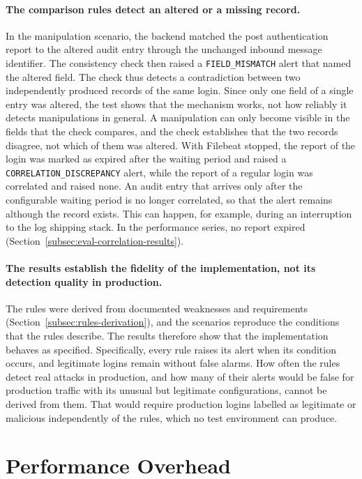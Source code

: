 \documentclass[../main.tex]{subfiles}
\begin{document}
\paragraph{The comparison rules detect an altered or a missing record.} 
In the manipulation scenario, the backend matched the post authentication report to the altered 
audit entry through the unchanged inbound message identifier. 
The consistency check then raised a \texttt{FIELD\_\allowbreak{}MISMATCH} alert that named the altered field. 
The check thus detects a contradiction between two independently produced records of the same login. 
Since only one field of a single entry was altered, the test shows that the mechanism works, not how 
reliably it detects manipulations in general. 
A manipulation can only become visible in the fields that the check compares, and the check 
establishes that the two records disagree, not which of them was altered. 
With Filebeat stopped, the report of the login was marked as expired after the waiting period and 
raised a \texttt{CORRELATION\_\allowbreak{}DISCREPANCY} alert, while the report of a regular login 
was correlated and raised none. 
An audit entry that arrives only after the configurable waiting period is no longer correlated, so 
that the alert remains although the record exists. 
This can happen, for example, during an interruption to the log shipping stack. 
In the performance series, no report expired (Section~\ref{subsec:eval-correlation-results}).

\paragraph{The results establish the fidelity of the implementation, not its detection quality in production.}
The rules were derived from documented weaknesses and requirements (Section~\ref{subsec:rules-derivation}), and 
the scenarios reproduce the conditions that the rules describe. 
The results therefore show that the implementation behaves as specified. 
Specifically, every rule raises its alert when its condition occurs, and legitimate logins remain without false alarms. 
How often the rules detect real attacks in production, and how many of their alerts would be false 
for production traffic with its unusual but legitimate configurations, cannot be derived from them. 
That would require production logins labelled as legitimate or malicious independently of the 
rules, which no test environment can produce. 

\section{Performance Overhead}\label{sec:overhead}
\end{document}

